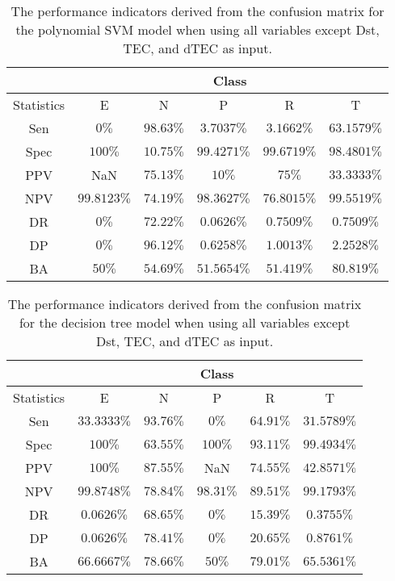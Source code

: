 \begin{table}[!ht]
	\centering
	\begin{tabular}{|c|c|c|c|c|c|}
		\hline
		 & \multicolumn{5}{c|}{Class} \\ \hline
		Statistics & E & N & P & R & T \\ \hline
		Sen & $0\%$ & $98.63\%$ & $3.7037\%$ & $3.1662\%$ & $63.1579\%$ \\ \hline
		Spec & $100\%$ & $10.75\%$ & $99.4271\%$ & $99.6719\%$ & $98.4801\%$ \\ \hline
		PPV & NaN & $75.13\%$ & $10\%$ & $75\%$ & $33.3333\%$ \\ \hline
		NPV & $99.8123\%$ & $74.19\%$ & $98.3627\%$ & $76.8015\%$ & $99.5519\%$ \\ \hline
		DR & $0\%$ & $72.22\%$ & $0.0626\%$ & $0.7509\%$ & $0.7509\%$ \\ \hline
		DP & $0\%$ & $96.12\%$ & $0.6258\%$ & $1.0013\%$ & $2.2528\%$ \\ \hline
		BA & $50\%$ & $54.69\%$ & $51.5654\%$ & $51.419\%$ & $80.819\%$ \\ \hline
	\end{tabular}
	\caption{The performance indicators derived from the confusion matrix for the polynomial SVM model when using all variables except Dst, TEC, and dTEC as input.}
	\label{tab:cs:reverse:noTEC:svmPoly}
\end{table}

\begin{table}[!ht]
	\centering
	\begin{tabular}{|c|c|c|c|c|c|}
		\hline
		 & \multicolumn{5}{c|}{Class} \\ \hline
		Statistics & E & N & P & R & T \\ \hline
		Sen & $33.3333\%$ & $93.76\%$ & $0\%$ & $64.91\%$ & $31.5789\%$ \\ \hline
		Spec & $100\%$ & $63.55\%$ & $100\%$ & $93.11\%$ & $99.4934\%$ \\ \hline
		PPV & $100\%$ & $87.55\%$ & NaN & $74.55\%$ & $42.8571\%$ \\ \hline
		NPV & $99.8748\%$ & $78.84\%$ & $98.31\%$ & $89.51\%$ & $99.1793\%$ \\ \hline
		DR & $0.0626\%$ & $68.65\%$ & $0\%$ & $15.39\%$ & $0.3755\%$ \\ \hline
		DP & $0.0626\%$ & $78.41\%$ & $0\%$ & $20.65\%$ & $0.8761\%$ \\ \hline
		BA & $66.6667\%$ & $78.66\%$ & $50\%$ & $79.01\%$ & $65.5361\%$ \\ \hline
	\end{tabular}
	\caption{The performance indicators derived from the confusion matrix for the decision tree model when using all variables except Dst, TEC, and dTEC as input.}
	\label{tab:cs:reverse:noTEC:C5.0}
\end{table}

